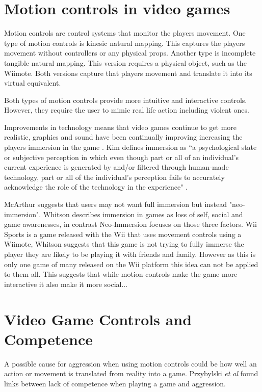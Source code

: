 \documentclass{scrartcl}
\begin{document}
\section{Motion controls in video games}
Motion controls are control systems that monitor the players movement. One type of motion controls is kinesic natural mapping. This captures the players movement without controllers or any physical props. Another type is incomplete tangible natural mapping. This version requires a physical object, such as the Wiimote. Both versions capture that players movement and translate it into its virtual equivalent.  \cite{McEwan2012}

Both types of motion controls provide more intuitive and interactive controls. \cite{Kim}  However, they require the user to mimic real life action including violent ones. 


\bigskip
Improvements in technology means that video games continue to get more realistic, graphics and sound have been continually improving increasing the players immersion in the game \cite{Kim}. Kim defines immersion as ``a psychological state or subjective perception in which even though part or all of an   individual’s   current   experience is generated by and/or filtered through human-made technology, part or all of the individual’s perception fails to accurately acknowledge the role of the technology in the experience" \cite{Kim}.

\bigskip
McArthur suggests that users may not want full immersion but instead "neo-immersion". \cite{McArthur} Whitson describes immersion in games as loss of  self, social and game awarenesses, in contrast Neo-Immersion focuses on those three factors. \cite{Whitson} Wii Sports is a game released with the Wii that uses movement controls using a Wiimote, Whitson suggests that this game is not trying to fully immerse the player they are likely to be playing it with friends and family. However as this is only one game of many released on the Wii platform this idea can not be applied to them all. 
This suggests that while motion controls make the game more interactive it also make it more social...
\bigskip


\section{Video Game Controls and Competence}
A possible cause for aggression when using motion controls could be how well an action or movement is translated from reality into a game.  Przybylski \textit{et al} found links between lack of competence when playing a game and aggression. \cite{przybylski}
\end{document}
